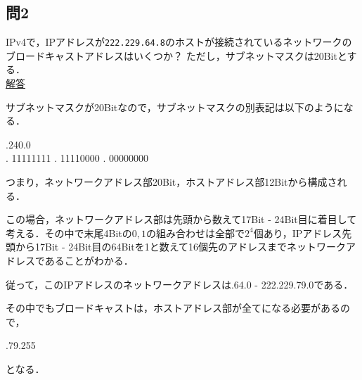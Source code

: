 \documentclass[paper=a4,10pt,twocolumn]{jlreq}
\renewcommand{\indent}{\hspace{1\zw}}
\begin{document}
\subsection*{問2}
IPv4で，IPアドレスが\verb|222.229.64.8|のホストが接続されているネットワークのブロードキャストアドレスはいくつか？
ただし，サブネットマスクは20Bitとする．\\
\underline{解答}\par
サブネットマスクが20Bitなので，サブネットマスクの別表記は以下のようになる．
\begin{center}
    {.240.0}\\
    { . 11111111 . 11110000 . 00000000}
\end{center}
\indent つまり，ネットワークアドレス部20Bit，ホストアドレス部12Bitから構成される．\par
この場合，ネットワークアドレス部は先頭から数えて17Bit - 24Bit目に着目して考える．その中で末尾4Bitの\(0,1\)の組み合わせは全部で\(2^4\)個あり，IPアドレス先頭から17Bit - 24Bit目の64Bitを1と数えて16個先のアドレスまでネットワークアドレスであることがわかる．\par
従って，このIPアドレスのネットワークアドレスは{.64.0 - 222.229.79.0}である．\par
その中でもブロードキャストは，ホストアドレス部が全て{}になる必要があるので，
\begin{center}
    {.79.255}
\end{center}
となる．
\end{document}
